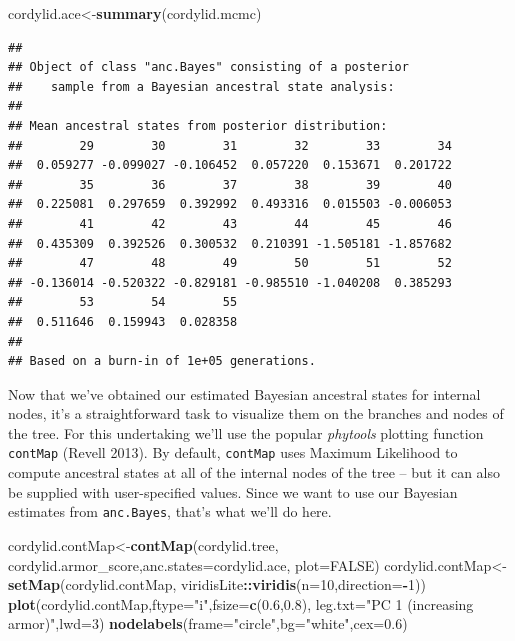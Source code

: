 \documentclass[fleqn,10pt,lineno]{wlpeerj} %
\newenvironment{Shaded}{\begin{snugshade}}{\end{snugshade}}
\newcommand{\AttributeTok}[1]{\textcolor[rgb]{0.13,0.29,0.53}{#1}}
\newcommand{\ConstantTok}[1]{\textcolor[rgb]{0.56,0.35,0.01}{#1}}
\newcommand{\DecValTok}[1]{\textcolor[rgb]{0.00,0.00,0.81}{#1}}
\newcommand{\FloatTok}[1]{\textcolor[rgb]{0.00,0.00,0.81}{#1}}
\newcommand{\FunctionTok}[1]{\textcolor[rgb]{0.13,0.29,0.53}{\textbf{#1}}}
\newcommand{\NormalTok}[1]{#1}
\newcommand{\OtherTok}[1]{\textcolor[rgb]{0.56,0.35,0.01}{#1}}
\newcommand{\SpecialCharTok}[1]{\textcolor[rgb]{0.81,0.36,0.00}{\textbf{#1}}}
\newcommand{\StringTok}[1]{\textcolor[rgb]{0.31,0.60,0.02}{#1}}
\begin{document}
\begin{Shaded}
\begin{Highlighting}[]
\NormalTok{cordylid.ace}\OtherTok{\textless{}{-}}\FunctionTok{summary}\NormalTok{(cordylid.mcmc)}
\end{Highlighting}
\end{Shaded}

\begin{verbatim}
## 
## Object of class "anc.Bayes" consisting of a posterior
##    sample from a Bayesian ancestral state analysis:
## 
## Mean ancestral states from posterior distribution:
##        29        30        31        32        33        34 
##  0.059277 -0.099027 -0.106452  0.057220  0.153671  0.201722 
##        35        36        37        38        39        40 
##  0.225081  0.297659  0.392992  0.493316  0.015503 -0.006053 
##        41        42        43        44        45        46 
##  0.435309  0.392526  0.300532  0.210391 -1.505181 -1.857682
##        47        48        49        50        51        52
## -0.136014 -0.520322 -0.829181 -0.985510 -1.040208  0.385293
##        53        54        55 
##  0.511646  0.159943  0.028358 
## 
## Based on a burn-in of 1e+05 generations.
\end{verbatim}

Now that we've obtained our estimated Bayesian ancestral states for internal nodes, it's a straightforward task to visualize them on the branches and nodes of the tree. For this undertaking we'll use the popular \emph{phytools} plotting function \texttt{contMap} (Revell 2013). By default, \texttt{contMap} uses Maximum Likelihood to compute ancestral states at all of the internal nodes of the tree -- but it can also be supplied with user-specified values. Since we want to use our Bayesian estimates from \texttt{anc.Bayes}, that's what we'll do here.

\begin{Shaded}
\begin{Highlighting}[]
\NormalTok{cordylid.contMap}\OtherTok{\textless{}{-}}\FunctionTok{contMap}\NormalTok{(cordylid.tree,}
\NormalTok{  cordylid.armor\_score,}\AttributeTok{anc.states=}\NormalTok{cordylid.ace,}
  \AttributeTok{plot=}\ConstantTok{FALSE}\NormalTok{)}
\NormalTok{cordylid.contMap}\OtherTok{\textless{}{-}}\FunctionTok{setMap}\NormalTok{(cordylid.contMap,}
\NormalTok{  viridisLite}\SpecialCharTok{::}\FunctionTok{viridis}\NormalTok{(}\AttributeTok{n=}\DecValTok{10}\NormalTok{,}\AttributeTok{direction=}\SpecialCharTok{{-}}\DecValTok{1}\NormalTok{))}
\FunctionTok{plot}\NormalTok{(cordylid.contMap,}\AttributeTok{ftype=}\StringTok{"i"}\NormalTok{,}\AttributeTok{fsize=}\FunctionTok{c}\NormalTok{(}\FloatTok{0.6}\NormalTok{,}\FloatTok{0.8}\NormalTok{),}
  \AttributeTok{leg.txt=}\StringTok{"PC 1 (increasing armor)"}\NormalTok{,}\AttributeTok{lwd=}\DecValTok{3}\NormalTok{)}
\FunctionTok{nodelabels}\NormalTok{(}\AttributeTok{frame=}\StringTok{"circle"}\NormalTok{,}\AttributeTok{bg=}\StringTok{"white"}\NormalTok{,}\AttributeTok{cex=}\FloatTok{0.6}\NormalTok{)}
\end{Highlighting}
\end{Shaded}
\end{document}
